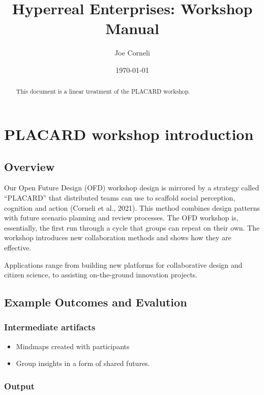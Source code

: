 \documentclass{article}
\author{Joe Corneli}
\date{\today}
\title{Hyperreal Enterprises: Workshop Manual}
\begin{document}
\maketitle
\begin{abstract}
\noindent This document is a linear treatment of the PLACARD workshop.
\end{abstract}

\setcounter{tocdepth}{2}
\tableofcontents
\section{PLACARD workshop introduction}
\label{b7b42aa2-c57c-4bcc-bc45-be9b63972be7}
\subsection{Overview}

Our Open Future Design (OFD) workshop design is mirrored by a strategy
called ``PLACARD'' that distributed teams can use to scaffold social
perception, cognition and action (Corneli et al., 2021).  This method
combines design patterns with future scenario planning and review
processes.  The OFD workshop is, essentially, the first run through a
cycle that groups can repeat on their own.  The workshop introduces
new collaboration methods and shows how they are effective.

Applications range from building new platforms for collaborative
design and citizen science, to assisting on-the-ground innovation
projects.

\subsection{Example Outcomes and Evalution}

\subsubsection{Intermediate artifacts}

\begin{itemize}
\item Mindmaps created with participants
\item Group insights in a form of shared futures.
\end{itemize}

\subsubsection{Output}
\end{document}

